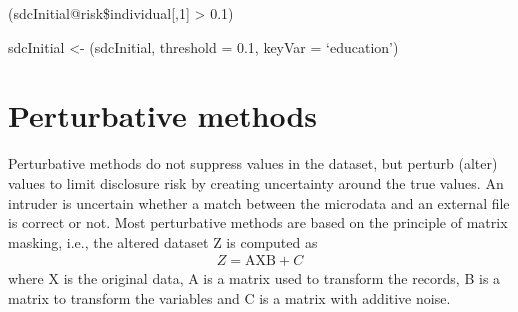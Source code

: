 \documentclass[letterpaper,10pt,english]{sphinxmanual}
\begin{document}
\begin{DUlineblock}{0em}
\item[] 
\item[] 
\end{DUlineblock}

\begin{DUlineblock}{0em}
\item[] 
\item[] (sdcInitial@risk\$individual{[},1{]} \textgreater{} 0.1)
\end{DUlineblock}


\begin{DUlineblock}{0em}
\item[] 
\item[] sdcInitial \textless{}- (sdcInitial, threshold = 0.1, keyVar =
‘education’)
\end{DUlineblock}


\section{Perturbative methods}
\label{\detokenize{anon_methods:perturbative-methods}}
Perturbative methods do not suppress values in the dataset, but perturb
(alter) values to limit disclosure risk by creating uncertainty around
the true values. An intruder is uncertain whether a match between the
microdata and an external file is correct or not. Most perturbative
methods are based on the principle of matrix masking, i.e., the altered
dataset Z is computed as
\begin{equation*}
\begin{split}Z = \text{AXB} + C\end{split}
\end{equation*}
where X is the original data, A is a matrix used to transform the
records, B is a matrix to transform the variables and C is a matrix with
additive noise.
\end{document}
